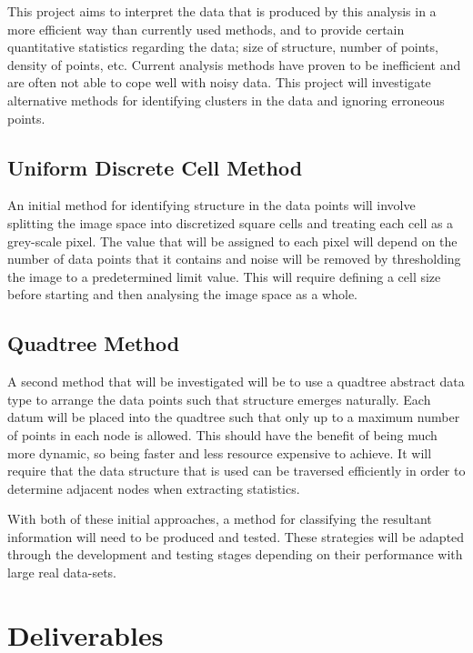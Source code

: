 This project aims to interpret the data that is produced by this analysis in a
more efficient way than currently used methods, and to provide certain
quantitative statistics regarding the data; size of structure, number of
points, density of points, etc. Current analysis methods have proven to be
inefficient and are often not able to cope well with noisy data. This project
will investigate alternative methods for identifying clusters in the data and
ignoring erroneous points.

\subsection{Uniform Discrete Cell Method}
\label{sub:uniform_discrete_cell_method}

An initial method for identifying structure in the data points will involve
splitting the image space into discretized square cells and treating each cell
as a grey-scale pixel. The value that will be assigned to each pixel will
depend on the number of data points that it contains and noise will be removed
by thresholding the image to a predetermined limit value. This will require
defining a cell size before starting and then analysing the image space as a
whole.

\subsection{Quadtree Method}
\label{sub:quadtree_method}

A second method that will be investigated will be to use a quadtree abstract
data type to arrange the data points such that structure emerges naturally.
Each datum will be placed into the quadtree such that only up to a maximum
number of points in each node is allowed. This should have the benefit of being
much more dynamic, so being faster and less resource expensive to achieve. It
will require that the data structure that is used can be traversed efficiently
in order to determine adjacent nodes when extracting statistics.

With both of these initial approaches, a method for classifying the resultant
information will need to be produced and tested. These strategies will be
adapted through the development and testing stages depending on their
performance with large real data-sets.

\section{Deliverables}
\label{sec:deliverables}

